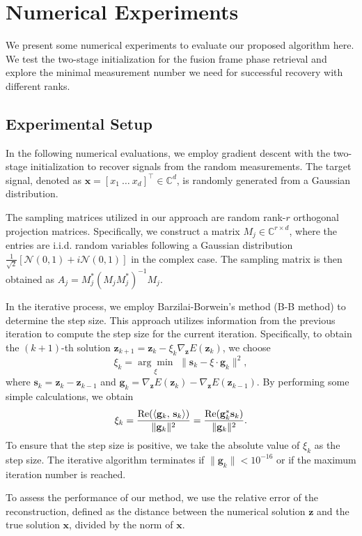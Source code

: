 \documentclass{article}
\newcommand{\C}{{\mathbb C}}
\newcommand{\calN}{{\mathcal N}}
\newcommand{\re}{{\rm Re}}
\newcommand{\vx}{{\mathbf x}}
\newcommand{\vz}{{\mathbf z}}
\newcommand{\vs}{{\mathbf s}}
\newcommand{\vg}{{\mathbf g}}
\newcommand{\0}{{\mathbf 0}}
\numberwithin{equation}{section}
\begin{document}
	\section{Numerical Experiments}
	\label{sec:numerical}
	We present some numerical experiments to evaluate our proposed algorithm here. We test the two-stage initialization for the fusion frame phase retrieval and explore the minimal measurement number we need for successful recovery with different ranks.
	
	\subsection{Experimental Setup}
	In the following numerical evaluations, we employ gradient descent with the two-stage initialization to recover signals from the random measurements. The target signal, denoted as $\vx=[x_1\ \ldots\ x_d]^\top \in\C^d$, is randomly generated from a Gaussian distribution.
	
	The sampling matrices utilized in our approach are random rank-$r$ orthogonal projection matrices. Specifically, we construct a matrix $M_j\in\C^{r\times d}$, where the entries are i.i.d. random variables following a Gaussian distribution $\frac{1}{\sqrt{2}}[\calN(0,1)+i\calN(0,1)]$ in the complex case. The sampling matrix is then obtained as $A_j=M_j^*(M_jM^*_j)^{-1}M_j$.
	
	In the iterative process, we employ Barzilai-Borwein's method (B-B method) to determine the step size. This approach utilizes information from the previous iteration to compute the step size for the current iteration. Specifically, to obtain the $(k+1)$-th solution $\vz_{k+1}=\vz_k-\xi_k\nabla_{\vz} E(\vz_k)$, we choose
	\begin{equation*}
		\xi_k=\underset{\xi}{\arg\min} \,\,\|\vs_k-\xi\cdot\vg_k\|^2,
	\end{equation*}
	where $\vs_k=\vz_k-\vz_{k-1}$ and $\vg_k=\nabla_{\vz} E(\vz_k)-\nabla_{\vz} E(\vz_{k-1})$.
	By performing some simple calculations, we obtain
	$$
	\xi_k=\frac{\re(\langle \vg_k,\,\vs_k\rangle)}{\|\vg_k\|^2}=\frac{ \re(\vg_k^*\vs_k)}{\|\vg_k\|^2}.
	$$
	To ensure that the step size is positive, we take the absolute value of $\xi_k$ as the step size. The iterative algorithm terminates if $\|\vg_k\| < 10^{-16}$ or if the maximum iteration number is reached.
	
	To assess the performance of our method, we use the relative error of the reconstruction, defined as the distance between the numerical solution $\vz$ and the true solution $\vx$, divided by the norm of $\vx$.
\end{document}

